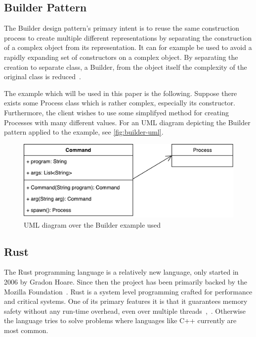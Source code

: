 \documentclass[conference]{IEEEtran}
\begin{document}
\subsection{Builder Pattern}
\label{sub:builder_pattern}

The Builder design pattern's primary intent is to reuse the same construction process to create multiple different representations by separating the construction of a complex object from its representation.
It can for example be used to avoid a rapidly expanding set of constructors on a complex object.
By separating the creation to separate class, a Builder, from the object itself the complexity of the original class is reduced~\cite{gamma1993:gof}.

The example which will be used in this paper is the following.
Suppose there exists some Process class which is rather complex, especially its constructor.
Furthermore, the client wishes to use some simplifyed method for creating Processes with many different values.
For an UML diagram depicting the Builder pattern applied to the example, see \autoref{fig:builder-uml}.

\begin{figure}[htpb]
    \centering
    \includegraphics[width=0.8\linewidth]{builder-ex.pdf}
    \caption{UML diagram over the Builder example used}
    \label{fig:builder-uml}
\end{figure}

\subsection{Rust}
\label{sub:rust}
The Rust programming language is a relatively new language, only started in 2006 by Gradon Hoare.
Since then the project has been primarily backed by the Mozilla Foundation~\cite{rustorg2017:faq}.
Rust is a system level programming crafted for performance and critical systems.
One of its primary features it is that it guarantees memory safety without any run-time overhead, even over multiple threads~\cite{matsakis:2014:rustlang},~\cite{reed2015:proof}.
Otherwise the language tries to solve problems where languages like C++ currently are most common.
\end{document}
